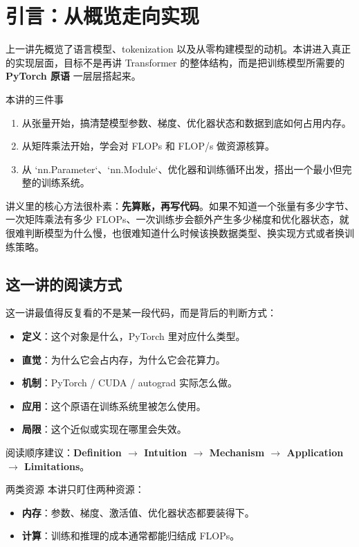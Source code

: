 \section{引言：从概览走向实现}

上一讲先概览了语言模型、tokenization 以及从零构建模型的动机。本讲进入真正的实现层面，目标不是再讲 Transformer 的整体结构，而是把训练模型所需要的 \textbf{PyTorch 原语} 一层层搭起来。

\begin{importantbox}{本讲的三件事}
\begin{enumerate}
    \item 从张量开始，搞清楚模型参数、梯度、优化器状态和数据到底如何占用内存。
    \item 从矩阵乘法开始，学会对 FLOPs 和 FLOP/s 做资源核算。
    \item 从 `nn.Parameter`、`nn.Module`、优化器和训练循环出发，搭出一个最小但完整的训练系统。
\end{enumerate}
\end{importantbox}

讲义里的核心方法很朴素：\textbf{先算账，再写代码}。如果不知道一个张量有多少字节、一次矩阵乘法有多少 FLOPs、一次训练步会额外产生多少梯度和优化器状态，就很难判断模型为什么慢，也很难知道什么时候该换数据类型、换实现方式或者换训练策略。

\subsection{这一讲的阅读方式}

这一讲最值得反复看的不是某一段代码，而是背后的判断方式：
\begin{itemize}
    \item \textbf{定义}：这个对象是什么，PyTorch 里对应什么类型。
    \item \textbf{直觉}：为什么它会占内存，为什么它会花算力。
    \item \textbf{机制}：PyTorch / CUDA / autograd 实际怎么做。
    \item \textbf{应用}：这个原语在训练系统里被怎么使用。
    \item \textbf{局限}：这个近似或实现在哪里会失效。
\end{itemize}

阅读顺序建议：\textbf{Definition $\to$ Intuition $\to$ Mechanism $\to$ Application $\to$ Limitations}。

\begin{knowledgebox}{两类资源}
本讲只盯住两种资源：
\begin{itemize}
    \item \textbf{内存}：参数、梯度、激活值、优化器状态都要装得下。
    \item \textbf{计算}：训练和推理的成本通常都能归结成 FLOPs。
\end{itemize}
\end{knowledgebox}

